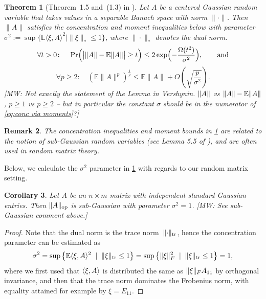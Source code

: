 \documentclass[aos]{imsart}
\newtheorem{theorem}{Theorem}[section]
\newtheorem{corollary}[theorem]{Corollary}
\newtheorem{remark}[theorem]{Remark}
\theoremstyle{definition}
\numberwithin{equation}{section}
\DeclareMathOperator{\op}{op}
\DeclarePairedDelimiter{\abs}{\lvert}{\rvert}
\DeclarePairedDelimiter{\norm}{\lVert}{\rVert}
\newcommand{\E}{\mathbb{E}}
\newcommand{\MW}[1]{{\color{red}[MW: #1]}}
\newcommand{\MW}[1]{{}}
\begin{document}
\begin{appendix}
\begin{theorem}[Theorem~1.5 and~(1.3) in \cite{P86}]\label{thm:banach conc}
Let $A$ be a centered Gaussian random variable that takes values in a separable Banach space with norm $\|\cdot\|$.
Then $\|A\|$ satisfies the concentration and moment inequalities below with parameter $\sigma^2 := \sup \{ \E \langle \xi, A \rangle^{2} \mid \|\xi\|_{*} \leq 1 \}$, where $\|\cdot\|_{*}$ denotes the dual norm.
\[ \forall t > 0 \colon \quad \Pr\Bigl( \abs[\big]{\norm A - \E \norm A} \geq t\Bigr) \leq 2 \exp\Bigl( - \frac{\Omega(t^2)}{\sigma^{2}}\Bigr)  , \qquad \text{and}  \]
\begin{equation}\label{eq:conc via moments}
  \forall p \geq 2 \colon \quad (\E \|A\|^{p})^{\frac{1}{p}} \leq \E \|A\| + O \left( \sqrt{\frac{p}{\sigma^{2}}} \right).
\end{equation}
\MW{Not exactly the statement of the Lemma in Vershynin. $\norm A$ vs $\norm A - \E \norm A$, $p\geq1$ vs $p\geq 2$ -- but in particular the constant $\sigma$ should be in the numerator of \cref{eq:conc via moments}?}
\end{theorem}

\begin{remark}
The concentration inequalities and moment bounds in \cref{thm:banach conc} are related to the notion of sub-Gaussian random variables (see Lemma 5.5 of \cite{vershynin2010introduction}), and are often used in random matrix theory. 
\end{remark}

Below, we calculate the $\sigma^{2}$ parameter in \cref{thm:banach conc} with regards to our random matrix setting. 

\begin{corollary}\label{lem:opNormSubG}
Let $A$ be an $n \times m$ matrix with independent standard Gaussian entries.
Then $\norm{A}_{\op}$ is sub-Gaussian with parameter $\sigma^{2} = 1$. \MW{See sub-Gaussian comment above.}
\end{corollary}
\begin{proof}
Note that the dual norm is the trace norm~$\norm{\cdot}_{\operatorname{tr}}$, hence the concentration parameter can be estimated as
\begin{align*}
  \sigma^2
= \sup \left\{ \E \langle \xi, A \rangle^2 \;\mid\; \norm{\xi}_{\operatorname{tr}} \leq 1 \right\}
= \sup \left\{ \norm\xi_F^2 \;\mid\; \norm{\xi}_{\operatorname{tr}} \leq 1 \right\}
= 1,
\end{align*}
where we first used that $\braket{\xi,A}$ is distributed the same as $\norm\xi_F A_{11}$ by orthogonal invariance, and then that the trace norm dominates the Frobenius norm, with equality attained for example by $\xi = E_{11}$.
\end{proof}


\end{appendix}
\end{document}
